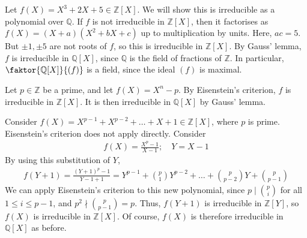 \begin{example}
	Let $f(X) = X^3 + 2X + 5 \in \mathbb Z[X]$.
	We will show this is irreducible as a polynomial over $\mathbb Q$.
	If $f$ is not irreducible in $\mathbb Z[X]$, then it factorises as $f(X) = (X+a)(X^2 + bX + c)$ up to multiplication by units.
	Here, $ac = 5$.
	But $\pm 1, \pm 5$ are not roots of $f$, so this is irreducible in $\mathbb Z[X]$.
	By Gauss' lemma, $f$ is irreducible in $\mathbb Q[X]$, since $\mathbb Q$ is the field of fractions of $\mathbb Z$.
	In particular, $\faktor{\mathbb Q[X]}{(f)}$ is a field, since the ideal $(f)$ is maximal.
\end{example}
\begin{example}
	Let $p \in \mathbb Z$ be a prime, and let $f(X) = X^n - p$.
	By Eisenstein's criterion, $f$ is irreducible in $\mathbb Z[X]$.
	It is then irreducible in $\mathbb Q[X]$ by Gauss' lemma.
\end{example}
\begin{example}
	Consider $f(X) = X^{p-1} + X^{p-2} + \dots + X + 1 \in \mathbb Z[X]$, where $p$ is prime.
	Eisenstein's criterion does not apply directly.
	Consider
	\begin{align*}
		f(X) = \frac{X^p - 1}{X - 1};\quad Y = X - 1
	\end{align*}
	By using this substitution of $Y$,
	\begin{align*}
		f(Y+1) = \frac{(Y+1)^p - 1}{Y-1 + 1} = Y^{p-1} + \binom{p}{1} Y^{p-2} + \dots + \binom{p}{p-2} Y + \binom{p}{p-1}
	\end{align*}
	We can apply Eisenstein's criterion to this new polynomial, since $p \mid \binom{p}{i}$ for all $1 \leq i \leq p - 1$, and $p^2 \nmid \binom{p}{p-1} = p$.
	Thus, $f(Y+1)$ is irreducible in $\mathbb Z[Y]$, so $f(X)$ is irreducible in $\mathbb Z[X]$.
	Of course, $f(X)$ is therefore irreducible in $\mathbb Q[X]$ as before.
\end{example}
